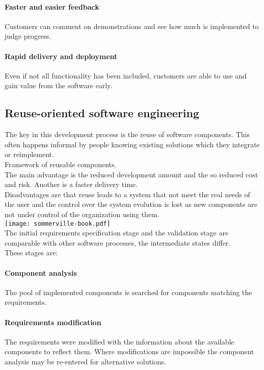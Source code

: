 \documentclass[a4paper,11pt,twocolumn]{report}
\begin{document}
    \paragraph{Faster and easier feedback} Customers can comment on
    demonstrations and see how much is implemented to judge progress.
    \paragraph{Rapid delivery and deployment}
    Even if not all functionality has been included, customers are able to use
    and gain value from the software early.
    \subsection{Reuse-oriented software engineering}
    The key in this development process is the reuse of software components.
    This often happens informal by people knowing existing solutions which they
    integrate or reimplement.\\
    Framework of reusable components.\\
    The main advantage is the reduced development amount and the so reduced
    cost and risk. Another is a faster delivery time.\\
    Disadvantages are that reuse leads to a system that not meet the real needs
    of the user and the control over the system evolution is lost as new
    components are not under control of the organization using them.\\
    \texttt{[image: sommerville-book.pdf]}\\
    The initial requirements specification stage and the validation stage are
    comparable with other software processes, the intermediate states differ.\\
    These stages are:
    \paragraph{Component analysis}
    The pool of implemented components is searched for components matching the
    requirements.
    \paragraph{Requirements modification}
    The requirements were modified with the information about the available
    components to reflect them. Where modifications are impossible the
    component analysis may be re-entered for alternative solutions.
\end{document}

